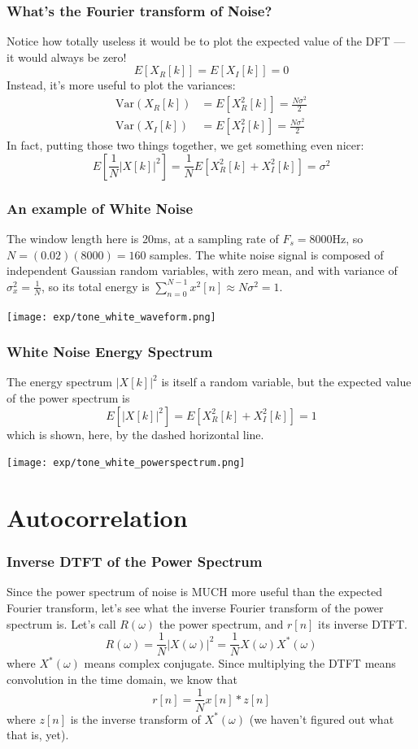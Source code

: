 \documentclass{beamer}
\begin{document}
\begin{frame}
  \frametitle{What's the Fourier transform of Noise?}

  Notice how totally useless it would be to plot the expected value of
  the DFT --- it would always be zero!
  \[
  E\left[X_R[k]\right]=E\left[X_I[k]\right]=0
  \]
  Instead, it's more useful to plot the variances:
  \begin{align*}
  \mbox{Var}\left(X_R[k]\right) &=E\left[X_R^2[k]\right]=\frac{N\sigma^2}{2}  \\
  \mbox{Var}\left(X_I[k]\right) &=E\left[X_I^2[k]\right]=\frac{N\sigma^2}{2}
  \end{align*}
  In fact, putting those two things together, we get something even nicer:
  \[
  E\left[\frac{1}{N}|X[k]|^2\right] = \frac{1}{N}E\left[X_R^2[k]+X_I^2[k]\right] = \sigma^2
  \]
\end{frame}

\begin{frame}
  \frametitle{An example of White Noise}

  The window length here is 20ms, at a sampling rate of $F_s=8000$Hz,
  so $N=(0.02)(8000)=160$ samples.  The white noise signal is composed
  of independent Gaussian random variables, with zero mean, and with
  variance of $\sigma_x^2=\frac{1}{N}$, so its total energy is
  $\sum_{n=0}^{N-1}x^2[n] \approx N\sigma^2 = 1$.
  
  \centerline{\texttt{[image: exp/tone\_white\_waveform.png]}}
\end{frame}

\begin{frame}
  \frametitle{White Noise Energy Spectrum}

  The energy spectrum $|X[k]|^2$ is itself a random variable, but the
  expected value of the power spectrum is
  \[
  E\left[|X[k]|^2\right] = E\left[X_R^2[k]+X_I^2[k]\right] = 1
  \]
  which is shown, here, by the dashed horizontal line.
  \centerline{\texttt{[image: exp/tone\_white\_powerspectrum.png]}}
\end{frame}

\section[Autocorrelation]{Autocorrelation}
\setcounter{subsection}{1}

\begin{frame}
  \frametitle{Inverse DTFT of the Power Spectrum}

  Since the power spectrum of noise is MUCH more useful than the
  expected Fourier transform, let's see what the inverse Fourier transform of the power spectrum
  is.  Let's call $R(\omega)$ the power spectrum, and $r[n]$ its inverse
  DTFT.
  \[
  R(\omega) = \frac{1}{N}|X(\omega)|^2 = \frac{1}{N}X(\omega)X^*(\omega)
  \]
  where $X^*(\omega)$ means complex conjugate.  Since multiplying the DTFT
  means convolution in the time domain, we know that
  \[
  r[n] = \frac{1}{N} x[n]\ast z[n]
  \]
  where $z[n]$ is the inverse transform of $X^*(\omega)$ (we haven't
  figured out what that is, yet).
\end{frame}
\end{document}
